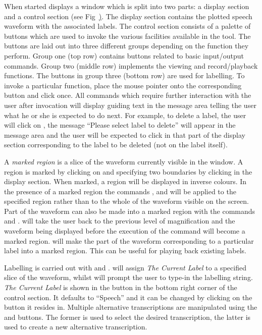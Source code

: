 When started  displays a window which is split into two parts: a
display section and a control section (see Fig~\href{f:hslab}). 
The display section contains the plotted speech waveform with the 
associated labels. The control section consists of a palette of buttons 
which are used to invoke the various facilities available in the tool. 
The buttons are laid out into three different groups depending on the 
function they perform. Group one (top row) contains buttons related to 
basic input/output commands. 
Group two (middle row) implements the viewing and record/playback functions. 
The buttons in group three (bottom row) are used for labelling. To invoke a 
particular function, place the mouse pointer onto the corresponding button 
and click once. All commands which require further interaction with the user 
after invocation will display guiding text in the message area telling the 
user what he or she is expected to do next. For example, to delete a label, 
the user will click on , the message ``Please select label to delete'' 
will appear in the message area and the user will be expected to click in that 
part of the display section corresponding to the label to be deleted (not on 
the label itself).

A {\em marked region} is a slice of the waveform currently visible in the 
window. A region is marked by clicking on  and specifying two 
boundaries by clicking in the display section. 
When marked, a region will be displayed in inverse colours. In the presence 
of a marked region the commands ,  and  
will be applied to the specified region rather than to the whole of the 
waveform visible on the screen. 
Part of the waveform can also be made into a marked region with the commands 
 and .  will take the user back 
to the previous level of magnification and the waveform being displayed before 
the execution of the command will become a marked region. 
 will make the part of the waveform corresponding to a particular 
label into a marked region. This can be useful for playing back existing labels. 

Labelling is carried out with  and . 
will assign {\em The Current Label} to a specified slice of the waveform,
whilst  will prompt the user to type-in the labelling string. 
{\em The Current Label} is shown in the button in the bottom right corner of 
the control section.  It defaults to ``Speech'' and it can be changed by clicking 
on the button it resides in. 
Multiple alternative transcriptions are manipulated using the  and 
 buttons. The former is used to select the desired transcription, the 
latter is used to create a new alternative transcription.

